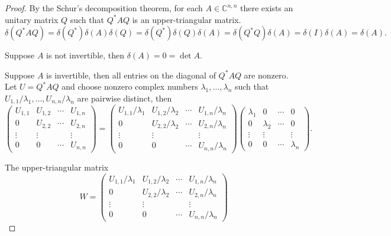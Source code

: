\begin{proof}
    By the Schur's decomposition theorem, for each $A\in\mathbb{C}^{n,n}$ there exists an unitary matrix $Q$ such that $Q^{*}AQ$ is an upper-triangular matrix.
    \[
        \delta(Q^{*}AQ) = \delta(Q^{*})\delta(A)\delta(Q) = \delta(Q^{*})\delta(Q)\delta(A) = \delta(Q^{*}Q)\delta(A) = \delta(I)\delta(A) = \delta(A).
    \]

    Suppose $A$ is not invertible, then $\delta(A) = 0 = \det A$.

    Suppose $A$ is invertible, then all entries on the diagonal of $Q^{*}AQ$ are nonzero. Let $U = Q^{*}AQ$ and choose nonzero complex numbers $\lambda_{1}, \ldots, \lambda_{n}$ such that $U_{1,1}/\lambda_{1}, \ldots, U_{n,n}/\lambda_{n}$ are pairwise distinct, then
    \[
        \begin{pmatrix}
            U_{1,1} & U_{1,2} & \cdots & U_{1,n} \\
            0       & U_{2,2} & \cdots & U_{2,n} \\
            \vdots  & \vdots  &        & \vdots  \\
            0       & 0       & \cdots & U_{n,n}
        \end{pmatrix} =
        \begin{pmatrix}
            U_{1,1}/\lambda_{1} & U_{1,2}/\lambda_{2} & \cdots & U_{1,n}/\lambda_{n} \\
            0                   & U_{2,2}/\lambda_{2} & \cdots & U_{2,n}/\lambda_{n} \\
            \vdots              & \vdots              &        & \vdots              \\
            0                   & 0                   & \cdots & U_{n,n}/\lambda_{n}
        \end{pmatrix}
        \begin{pmatrix}
            \lambda_{1} & 0           & \cdots & 0           \\
            0           & \lambda_{2} & \cdots & 0           \\
            \vdots      & \vdots      &        & \vdots      \\
            0           & 0           & \cdots & \lambda_{n}
        \end{pmatrix}.
    \]

    The upper-triangular matrix
    \[
        W = \begin{pmatrix}
            U_{1,1}/\lambda_{1} & U_{1,2}/\lambda_{2} & \cdots & U_{1,n}/\lambda_{n} \\
            0                   & U_{2,2}/\lambda_{2} & \cdots & U_{2,n}/\lambda_{n} \\
            \vdots              & \vdots              &        & \vdots              \\
            0                   & 0                   & \cdots & U_{n,n}/\lambda_{n}
        \end{pmatrix}
    \]


\end{proof}
